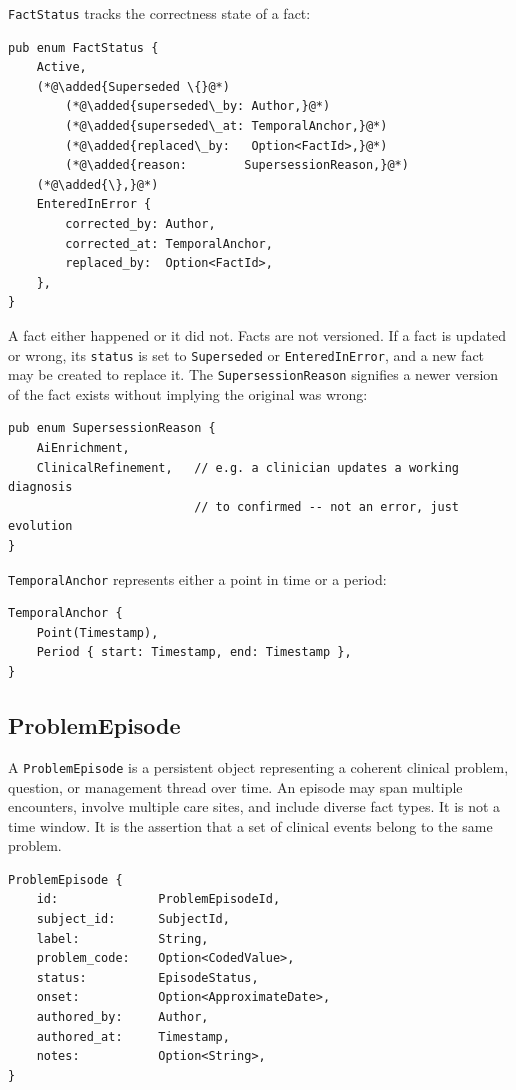\documentclass[11pt]{article}
\newcommand{\added}[1]{\textcolor{accentblue}{#1}}
\begin{document}
\texttt{FactStatus} tracks the correctness state of a fact:

\begin{lstlisting}
pub enum FactStatus {
    Active,
    (*@\added{Superseded \{}@*)
        (*@\added{superseded\_by: Author,}@*)
        (*@\added{superseded\_at: TemporalAnchor,}@*)
        (*@\added{replaced\_by:   Option<FactId>,}@*)
        (*@\added{reason:        SupersessionReason,}@*)
    (*@\added{\},}@*)
    EnteredInError {
        corrected_by: Author,
        corrected_at: TemporalAnchor,
        replaced_by:  Option<FactId>,
    },
}
\end{lstlisting}


A fact either happened or it did not. Facts are not versioned. If a fact is
updated or wrong, its \texttt{status} is set to \texttt{Superseded} or
\texttt{EnteredInError}, and a new fact may be created to replace it.
The \texttt{SupersessionReason} signifies a newer version of the fact exists without implying the original was wrong:
\begin{lstlisting}
pub enum SupersessionReason {
    AiEnrichment,
    ClinicalRefinement,   // e.g. a clinician updates a working diagnosis
                          // to confirmed -- not an error, just evolution
}
\end{lstlisting}

\texttt{TemporalAnchor} represents either a point in time or a period:

\begin{lstlisting}
TemporalAnchor {
    Point(Timestamp),
    Period { start: Timestamp, end: Timestamp },
}
\end{lstlisting}

\subsection{ProblemEpisode}

A \texttt{ProblemEpisode} is a persistent object representing a coherent
clinical problem, question, or management thread over time. An episode may
span multiple encounters, involve multiple care sites, and include diverse
fact types. It is not a time window. It is the assertion that a set of
clinical events belong to the same problem.

\begin{lstlisting}
ProblemEpisode {
    id:              ProblemEpisodeId,
    subject_id:      SubjectId,
    label:           String,
    problem_code:    Option<CodedValue>,
    status:          EpisodeStatus,
    onset:           Option<ApproximateDate>,
    authored_by:     Author,
    authored_at:     Timestamp,
    notes:           Option<String>,
}
\end{lstlisting}
\end{document}
